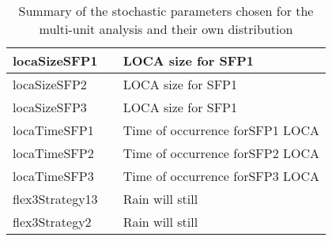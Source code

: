 \begin{table}
\begin{center}
\begin{tabular}{ | l | p{5cm} | p{5cm} |}
        locaSizeSFP1       &              & LOCA size for SFP1               \\ \hline
        locaSizeSFP2       &              & LOCA size for SFP1               \\ \hline
        locaSizeSFP3       &              & LOCA size for SFP1               \\ \hline    
        locaTimeSFP1       &              & Time of occurrence forSFP1 LOCA  \\ \hline
        locaTimeSFP2       &              & Time of occurrence forSFP2 LOCA  \\ \hline
        locaTimeSFP3       &              & Time of occurrence forSFP3 LOCA  \\ \hline
        flex3Strategy13    &              & Rain will still                  \\ \hline
        flex3Strategy2     &              & Rain will still                  \\ 
        \hline
      \end{tabular}
  \end{center}
  \caption{Summary of the stochastic parameters chosen for the multi-unit analysis and their own distribution}
  \label{tab:stochasticParameters}
\end{table}


